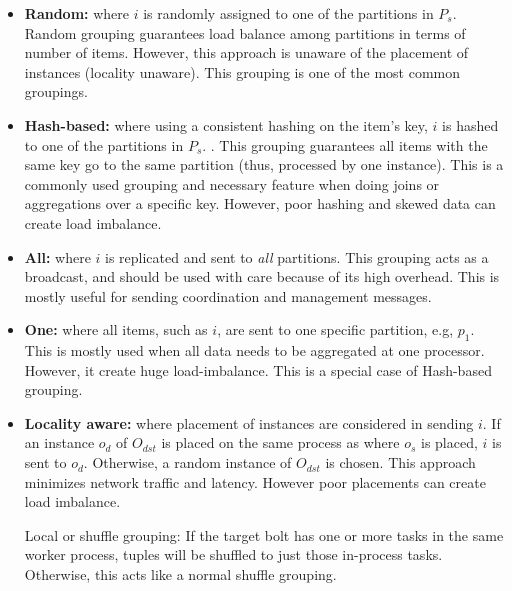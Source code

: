 \begin{itemize}
	\item \textbf{Random:} where $i$ is randomly assigned to one of the partitions in $P_s$. Random grouping guarantees load balance among partitions in terms of number of items. However, this approach is unaware of the placement of instances (locality unaware). This grouping is one of the most common groupings.
	\item \textbf{Hash-based:} where using a consistent hashing on the item's key, $i$ is hashed to one of the partitions in $P_s$. . This grouping guarantees all items with the same key go to the same partition (thus, processed by one instance). This is a commonly used grouping and necessary feature when doing joins or aggregations over a specific key. However, poor hashing and skewed data can create load imbalance.
	

	\item \textbf{All:} where $i$ is replicated and sent to \textit{all} partitions. This grouping acts as a broadcast, and should be used with care because of its high overhead. This is mostly useful for sending coordination and management messages.
	\item \textbf{One:} where all items, such as $i$,  are sent to one specific partition, e.g, $p_1$. This is mostly used when all data needs to be aggregated at one processor. However, it create huge load-imbalance. This is a special case of Hash-based grouping.
	\item \textbf{Locality aware:} where placement of instances are considered in sending $i$. If an instance $o_d$ of $O_{dst}$ is placed on the same process as where $o_s$ is placed, $i$ is sent to $o_d$. Otherwise, a random instance of $O_{dst}$ is chosen. This approach minimizes network traffic and latency. However poor placements can create load imbalance.


	

	Local or shuffle grouping: If the target bolt has one or more tasks in the same worker process, tuples will be shuffled to just those in-process tasks. Otherwise, this acts like a normal shuffle grouping.
\end{itemize}

